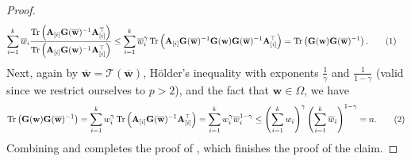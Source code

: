 \documentclass[10pt,a4paper]{amsart}
\newcommand{\Tr}{\operatorname{Tr}}
\newcommand{\bAblk}[1]{\mathbf{A}_{[#1]}}
\newcommand{\bG}{\mathbf{G}}
\newcommand{\bw}{\mathbf{w}}
\newcommand{\bwbar}{\overline{\mathbf{w}}}
\newcommand{\calT}{\mathcal{T}}
\newcommand\numberthis{\addtocounter{equation}{1}\tag{\theequation}}
\newcommand{\omrp}{\gamma}
\newcommand{\wbar}{\overline{w}}
\begin{document}
\begin{proof}
\begin{align*}
\sum_{i=1}^k \wbar_i\frac{\Tr\left(\bAblk{i}\bG(\bwbar)^{-1}\bAblk{i}^\top\right)}{\Tr\left(\bAblk{i}\bG(\bw)^{-1}\bAblk{i}^\top\right)} &\leq \sum_{i=1}^k \wbar_i^\omrp \Tr\left(\bAblk{i}\bG(\bwbar)^{-1}\bG(\bw) \bG(\bwbar)^{-1} \bAblk{i}^\top\right)= \Tr\left(\bG(\bw)\bG(\bwbar)^{-1}\right).\numberthis\label{eq:KLcon-4}
\end{align*}
Next, again by $\bwbar=\calT(\bwbar)$, H\"older's inequality with exponents $\frac{1}{\omrp}$ and $\frac{1}{1-\omrp}$ (valid since we restrict ourselves to $p>2$), and the fact that $\bw\in\Omega$, we have \[ \Tr\left(\bG(\bw)\bG(\bwbar)^{-1}\right)
= \sum_{i=1}^k w_i^\omrp \Tr\left( \bAblk{i}\bG(\bwbar)^{-1} \bAblk{i}^\top\right) = \sum_{i=1}^k w_i^\omrp \wbar_i^{1-\omrp}\leq \left(\sum_{i=1}^k w_i\right)^\omrp \left(\sum_{i=1}^k \wbar_i\right)^{1-\omrp} = n. \numberthis\label{eq:KLcon-5}\]  Combining  and  completes the proof of , which finishes the proof of the claim. 
\end{proof}
\end{document}
